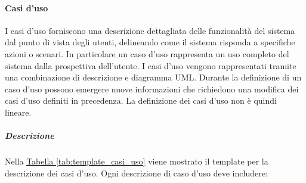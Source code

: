 \paragraph{Casi d'uso}
\label{par:casi_uso}
I casi d'uso forniscono una descrizione dettagliata delle funzionalità del sistema dal punto di vista degli utenti, delineando come il sistema risponda a specifiche azioni o scenari. 
In particolare un caso d'uso rappresenta un uso completo del sistema dalla prospettiva dell'utente.
I casi d'uso vengono rappresentati tramite una combinazione di descrizione e diagramma UML.
Durante la definizione di un caso d'uso possono emergere nuove informazioni che richiedono una modifica dei casi d'uso definiti in precedenza.
La definizione dei casi d'uso non è quindi lineare.

\subparagraph{Descrizione}
Nella \hyperref[tab:template_casi_uso]{Tabella \ref{tab:template_casi_uso}} viene mostrato il template per la descrizione dei casi d'uso.
Ogni descrizione di caso d'uso deve includere:
